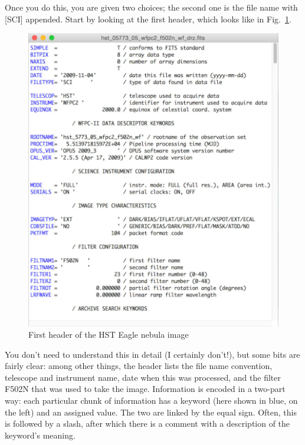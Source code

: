 \documentclass[twocolumn,apj]{openjournal}
\begin{document}
Once you do this, you are given two choices; the second one is the file name with [SCI] appended. Start by looking at the first header, which looks like in Fig.~\ref{EagleHeader1}.
\begin{figure}[htbp]
\begin{center}
\includegraphics[width=\linewidth]{header1.jpg}
\caption{First header of the HST Eagle nebula image}
\label{EagleHeader1}
\end{center}
\end{figure}
You don't need to understand this in detail (I certainly don't!), but some bits are fairly clear: among other things, the header lists the file name convention, telescope and instrument name, date when this was processed, and the filter F502N that was used to take the image. Information is encoded in a two-part way: each particular chunk of information has a keyword (here shown in blue, on the left) and an assigned value. The two are linked by the equal sign. Often, this is followed by a slash, after which there is a comment with a description of the keyword's meaning.
\end{document}
